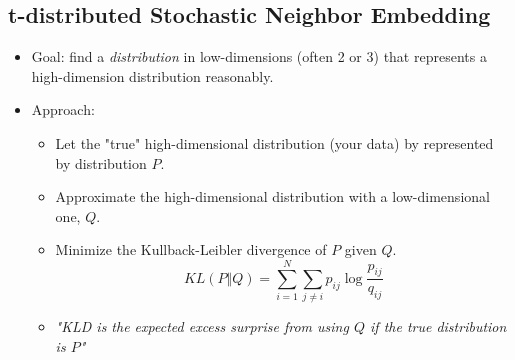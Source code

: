 \documentclass[10pt]{article}
\begin{document}
\subsection*{t-distributed Stochastic Neighbor Embedding}
\begin{itemize}
    \item Goal: find a \textit{distribution} in low-dimensions (often 2 or 3) that represents a high-dimension distribution reasonably.
    \item Approach:
    \begin{itemize}
        \item Let the "true" high-dimensional distribution (your data) by represented by distribution $P$.
        \item Approximate the high-dimensional distribution with a low-dimensional one, $Q$.
        \item Minimize the Kullback-Leibler divergence of $P$ given $Q$.
        \[KL(P \Vert Q) = \sum_{i = 1}^N \sum_{j \neq i} p_{ij} \log \frac{p_{ij}}{q_{ij}}\]
        \item \textit{"KLD is the expected excess surprise from using $Q$ if the true distribution is $P$"}
    \end{itemize}
\end{itemize}
\end{document}
